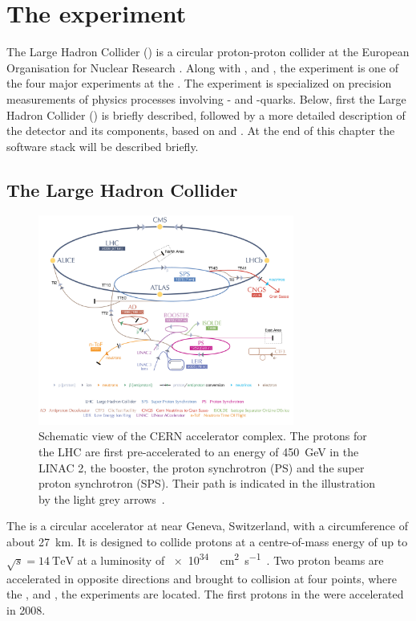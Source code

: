 \chapter{The \lhcb experiment}

\linespread{1.08}\selectfont
The Large Hadron Collider (\lhc) is a circular proton-proton collider at the European Organisation for Nuclear Research \cern.
Along with \atlas, \cms and \alice, the \lhcb experiment is one of the four major experiments at the \lhc.
The experiment is specialized on precision measurements of physics processes involving \bquark- and \cquark-quarks.
Below, first the Large Hadron Collider (\lhc) is briefly described, followed by a more detailed description of the \lhcb detector and its components, based on \cite{Alves:2008zz} and \cite{Aaij:2014jba}.
At the end of this chapter the \lhcb software stack will be described briefly.

\section{The Large Hadron Collider}

\begin{figure}[tbp]
    \centering
    \includegraphics[width=0.75\textwidth]{05lhcb/figs/cern.pdf}
    \caption{Schematic view of the CERN accelerator complex.
    The protons for the LHC are first pre-accelerated to an energy of \SI{450}{\giga\electronvolt} in the LINAC 2, the booster, the proton synchrotron (PS) and the super proton synchrotron (SPS).
    Their path is indicated in the illustration by the light grey arrows~\cite{Christiane:1260465}.}
    \label{fig:CernAccelerators}
\end{figure}
The \lhc is a circular accelerator at \cern near Geneva, Switzerland, with a circumference of about \SI{27}{\kilo\metre}.
It is designed to collide protons at a centre-of-mass energy of up to $\sqrt{s} = \SI{14}{\tera\electronvolt}$ at a luminosity of \SI{e34}{\per\cm\squared\per\second}~\cite{Bruening:782076}.
Two proton beams are accelerated in opposite directions and brought to collision at four points, where the \atlas, \cms and \alice, the \lhcb experiments are located.
The first protons in the \lhc were accelerated in \num{2008}.

